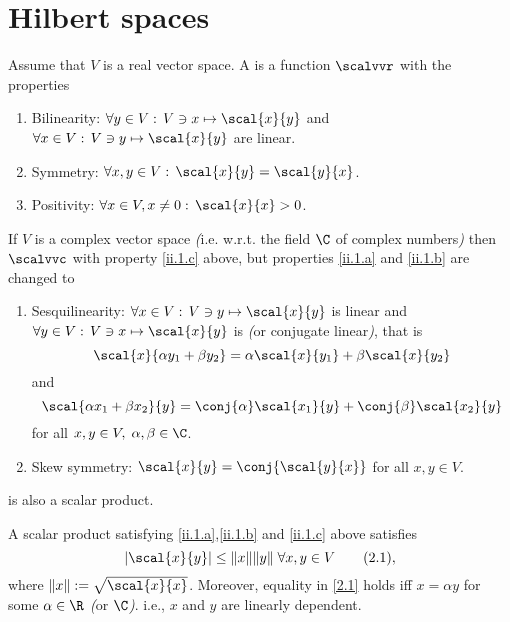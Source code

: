 \section{Hilbert spaces}

\begin{definition}\label{ii.1}
    Assume that $V$ is a real vector space. A  is a function $\scalvvr$ with the properties
    \begin{enumerate}[label=\alph*)]
        \item Bilinearity: $\forall y\in V:\, V\ni x\mapsto\scal{x}{y}$ and $\forall x\in V:\,V\ni y\mapsto\scal{x}{y}$ are linear.\label{ii.1.a}
        \item Symmetry: $\forall x,y\in V:\,\scal{x}{y}=\scal{y}{x}$.\label{ii.1.b}
        \item Positivity: $\forall x\in V,x\neq0:\,\scal{x}{x}>0$.\label{ii.1.c}
    \end{enumerate}
\end{definition}

\begin{definition}\label{ii.2}
    If $V$ is a complex vector space \emph{(}i.e. w.r.t. the field $\C$ of complex numbers\emph{)} then $\scalvvc$ with property \ref{ii.1.c} above, but properties \ref{ii.1.a} and \ref{ii.1.b} are changed to
    \begin{enumerate}[label=\alph*)]
        \item Sesquilinearity: $\forall x\in V:\, V\ni y\mapsto\scal{x}{y}$ is linear and $\forall y\in V:\, V\ni x\mapsto \scal{x}{y}$ is  \emph{(}or conjugate linear\emph{)}, that is
        \[\scal{x}{\alpha y_1+\beta y_2}=\alpha\scal{x}{y_1}+\beta\scal{x}{y_2}\]
        and
        \[\scal{\alpha x_1+\beta x_2}{y}=\conj{\alpha}\scal{x_1}{y}+\conj{\beta}\scal{x_2}{y}\]
        for all $x,y\in V,\;\alpha,\beta\in\C$.
        
        \item Skew symmetry: $\scal{x}{y}=\conj{\scal{y}{x}}$ for all $x,y\in V$.
    \end{enumerate}
    is also a scalar product.
\end{definition}

\begin{thm}\label{ii.3}
    A scalar product satisfying \ref{ii.1.a},\ref{ii.1.b} and \ref{ii.1.c} above satisfies
    \[|\scal{x}{y}|\leq\|x\|\|y\|\;\forall x,y\in V\tag{2.1}\label{2.1},\]
    where $\|x\|:=\sqrt{\scal{x}{x}}$. Moreover, equality in \eqref{2.1} holds iff $x=\alpha y$ for some $\alpha\in\R$ \emph{(}or $\C$\emph{)}. i.e., $x$ and $y$ are linearly dependent.
\end{thm}

